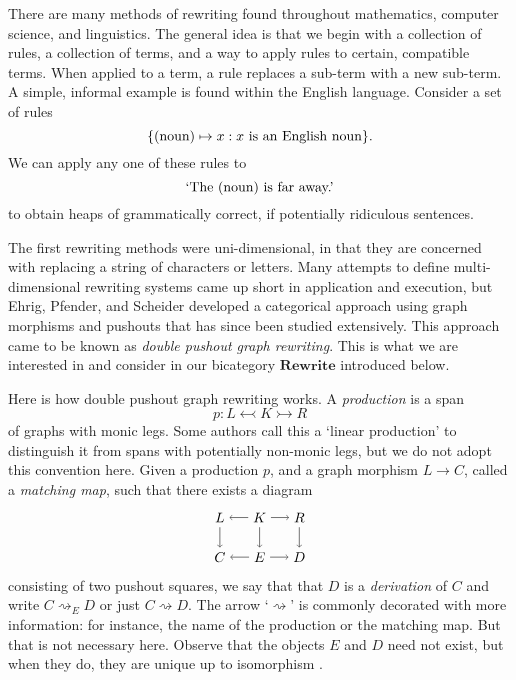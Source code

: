\documentclass{tac}
\newcommand{\cat}[1]{\mathbf{#1}}
\renewcommand{\t}[1]{\textup{#1}}
\newcommand{\from}{\colon}
\begin{document}
There are many methods of rewriting found throughout 
mathematics, computer science, and linguistics. 
The general idea is that we begin with a collection of rules, 
a collection of terms, and a way to apply rules to certain, compatible terms.  
When applied to a term, a rule replaces a sub-term with a new sub-term. 
A simple, informal example is found within the English language.  
Consider a set of rules 
\[
	\{ \t{(noun)} \mapsto x : x \t{ is an English noun} \}.
\]
We can apply any one of these rules to
\[
	\t{`The (noun) is far away.'}
\] 
to obtain heaps of grammatically correct, if potentially ridiculous sentences.  

The first rewriting methods were uni-dimensional, 
in that they are concerned with replacing a string of characters or letters. 
Many attempts to define multi-dimensional rewriting systems came up short 
in application and execution, but Ehrig, Pfender, and Scheider 
developed a categorical approach using graph morphisms and pushouts 
	\cite{Ehrig_GraphGramAlgAp} 
that has since been studied extensively. This approach came to be known as 
\textit{double pushout graph rewriting}. This is what we are interested in and 
consider in our bicategory $\cat{Rewrite}$ introduced below.

Here is how double pushout graph rewriting works. A \emph{production} is a span 
\[
	p \from L \leftarrowtail K \rightarrowtail R
\] 
of graphs with monic legs. Some authors call this a 
`linear production' to distinguish it from spans with potentially non-monic legs, 
but we do not adopt this convention here. Given a production $p$, 
and a graph morphism $L \to C$, called a \emph{matching map}, 
such that there exists a diagram
	\begin{equation} \label{diag:derivation}
		\begin{tikzpicture}
		\node (L) at (-1,1) {$L$};
		\node (K) at (0,1) {$K$};
		\node (R) at (1,1) {$R$};
		\node (C) at (-1,0) {$C$};
		\node (E) at (0,0) {$E$};
		\node (D) at (1,0) {$D$};
		\draw [->] (K) edge (L);
		\draw [->] (K) edge (E);
		\draw [->] (K) edge (R);
		\draw [->] (E) edge (C);
		\draw [->] (E) edge (D);
		\draw [->] (L) edge (C);
		\draw [->] (R) edge (D);
		\end{tikzpicture}
	\end{equation}
consisting of two pushout squares, we say that that $D$ is a 
\emph{derivation} of $C$ and write 
	$ C \rightsquigarrow_E D $ 
or just 
	$ C \rightsquigarrow D $. 
The arrow `$\rightsquigarrow$' is commonly decorated
with more information: for instance, the name of the production or the matching map.  
But that is not necessary here. Observe that the objects $E$ and $D$ 
need not exist, but when they do, they are unique up to isomorphism 
	\cite[Lemma 4.5]{LackSoboc_AdhesiveCategories}. 
\end{document}
